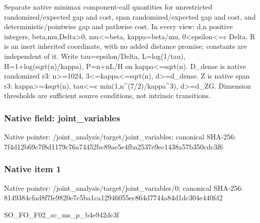 \documentclass[10pt,a4paper]{article}
\begin{document}
\begingroup\raggedright\sloppy Separate native minimax component-call quantities for unrestricted randomized/\allowbreak{}expected gap and cost,\allowbreak{} span randomized/\allowbreak{}expected gap and cost,\allowbreak{} and deterministic/\allowbreak{}pointwise gap and pathwise cost. In every view:\allowbreak{} d,\allowbreak{}n positive integers,\allowbreak{} beta,\allowbreak{}mu,\allowbreak{}Delta>0,\allowbreak{} mu<=\allowbreak{}beta,\allowbreak{} kappa=\allowbreak{}beta/\allowbreak{}mu,\allowbreak{} 0<epsilon<=\allowbreak{}c Delta. R is an inert inherited coordinate,\allowbreak{} with no added distance promise;\allowbreak{} constants are independent of it. Write tau=\allowbreak{}epsilon/\allowbreak{}Delta,\allowbreak{} L=\allowbreak{}log(1/\allowbreak{}tau),\allowbreak{} H=\allowbreak{}1+log(sqrt(n)/\allowbreak{}kappa),\allowbreak{} P=\allowbreak{}n+nL/\allowbreak{}H on kappa<=\allowbreak{}sqrt(n). D\_\allowbreak{}dense is native randomized r3:\allowbreak{} n>=\allowbreak{}1024,\allowbreak{} 3<=\allowbreak{}kappa<=\allowbreak{}sqrt(n),\allowbreak{} d>=\allowbreak{}d\_\allowbreak{}dense. Z is native span r3:\allowbreak{} kappa>=\allowbreak{}4sqrt(n),\allowbreak{} tau<=\allowbreak{}c min(1,\allowbreak{}n\textasciicircum{}(7/\allowbreak{}2)/\allowbreak{}kappa\textasciicircum{}3),\allowbreak{} d>=\allowbreak{}d\_\allowbreak{}ZG. Dimension thresholds are sufficient source conditions,\allowbreak{} not intrinsic transitions.\par\endgroup

\subsubsection{Native field: joint\_\allowbreak{}variables}
Native pointer: /joint\_\allowbreak{}analysis/target/joint\_\allowbreak{}variables; canonical SHA-256: 7f4d12b69c7f8d1179c76a74452bc89ae5e4fba2537e9ec1438a57b350cdc3f6

\subsubsection{Native item 1}
Native pointer: /joint\_\allowbreak{}analysis/target/joint\_\allowbreak{}variables/0; canonical SHA-256: 8149384cfad8f7fe9820e7c5ba1ca12946055ec864d7744a84d1dc304e440fd2

\begingroup\raggedright\sloppy SO\_\allowbreak{}FO\_\allowbreak{}F02\_\allowbreak{}sc\_\allowbreak{}ms\_\allowbreak{}p\_\allowbreak{}b4e942dc3f\par\endgroup
\end{document}

